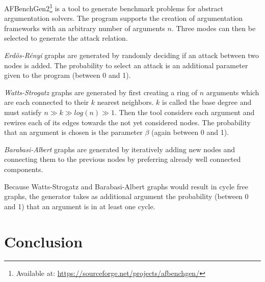 \documentclass[parskip=half]{scrartcl}
\begin{document}
AFBenchGen2\footnote{Available at:
\url{https://sourceforge.net/projects/afbenchgen/}} is a tool to generate
benchmark problems for abstract argumentation solvers\cite{afbenchgen2}. The
program supports the creation of argumentation frameworks with an arbitrary
number of arguments $n$. Three modes can then be selected to generate the
attack relation.

\emph{Erdös-Rényi} graphs are generated by randomly deciding if an attack
between two nodes is added. The probability to select an attack is an additional
parameter given to the program (between 0 and 1).

\emph{Watts-Strogatz} graphs are generated by first creating a ring of $n$
arguments which are each connected to their $k$ nearest neighbors. $k$ is called
the base degree and must satisfy $n \gg k \gg log(n) \gg 1$. Then the tool
considers each argument and rewires each of its edges towards the not yet
considered nodes. The probability that an argument is chosen is the parameter
$\beta$ (again between 0 and 1).

\emph{Barabasi-Albert} graphs are generated by iteratively adding new nodes and
connecting them to the previous nodes by preferring already well connected
components.

Because Watts-Strogatz and Barabasi-Albert graphs would result in cycle free
graphs, the generator takes as additional argument the probability (between 0
and 1) that an argument is in at least one cycle.


\section{Conclusion}
\label{conclusion}

\printbibliography
\end{document}

